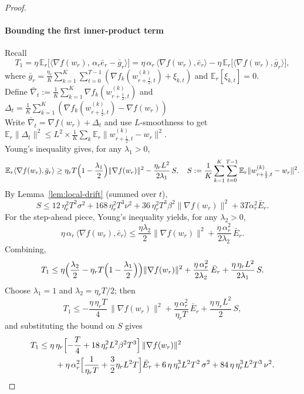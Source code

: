 \documentclass{article} %
\newcommand{\E}{\mathbb{E}}
\begin{document}
\begin{proof}
\paragraph{Bounding the first inner-product term}
Recall
\[
T_{1}
=\eta\,\E_{r}\!\bigl[\langle\nabla f(w_{r}),\,\alpha_{r}\bar e_{r}-\bar g_{r}\rangle\bigr]
= \eta\,\alpha_r\,\langle\nabla f(w_r),\bar e_r\rangle
   -\eta\,\E_r\!\bigl[\langle\nabla f(w_r),\bar g_r\rangle\bigr],
\]
where
\(
\bar g_r=\frac{\eta_r}{K}\sum_{k=1}^K\sum_{t=0}^{T-1}(\nabla f_k(w_{r+\frac12,t}^{(k)})+\xi_{k,t})
\)
and \(\E_r[\xi_{k,t}]=0\).\\
Define \(\bar\nabla_t := \frac1K\sum_{k=1}^K\nabla f_k(w_{r+\frac12,t}^{(k)})\) and \(\Delta_t = \frac1K\sum_{k=1}^K(\nabla f_k(w_{r+\frac12,t}^{(k)})-\nabla f(w_r))\) \\
Write \(\bar\nabla_t=\nabla f(w_r)+\Delta_t\) and use \(L\)-smoothness to get
\(
\E_r\|\Delta_t\|^2
\le L^2\times \frac1K\sum_k\E_r\|w_{r+\frac12,t}^{(k)}-w_r\|^2.
\) \\
Young’s inequality gives, for any \(\lambda_1>0\),
\[
\E_r\langle\nabla f(w_r),\bar g_r\rangle
\ge \eta_r T\Bigl(1-\frac{\lambda_1}{2}\Bigr)\|\nabla f(w_r)\|^2
-\frac{\eta_r L^2}{2\lambda_1}\,S,
\quad
S:=\frac1K\sum_{k=1}^K\sum_{t=0}^{T-1}\E_r\|w_{r+\frac12,t}^{(k)}-w_r\|^2.
\]
By Lemma~\ref{lem:local-drift} (summed over \(t\)),
\[
S \le
12\,\eta_r^{2}T^{2}\sigma^{2}
+168\,\eta_r^{2}T^{3}\nu^{2}
+36\,\eta_r^{2}T^{3}\beta^{2}\|\nabla f(w_r)\|^{2}
+3T\alpha_r^2 \bar E_r.
\]
For the step-ahead piece, Young’s inequality yields, for any \(\lambda_2>0\),
\[
\eta\,\alpha_r\,\langle\nabla f(w_r),\bar e_r\rangle
\le \frac{\eta\lambda_2}{2}\|\nabla f(w_r)\|^2
   +\frac{\eta\,\alpha_r^2}{2\lambda_2}\,\bar E_r.
\]
Combining,
\[
T_1
\le
\eta\Bigl(\frac{\lambda_2}{2}-\eta_r T\Bigl(1-\frac{\lambda_1}{2}\Bigr)\Bigr)\|\nabla f(w_r)\|^2
+\frac{\eta\,\alpha_r^2}{2\lambda_2}\,\bar E_r
+\frac{\eta\,\eta_r L^2}{2\lambda_1}\,S.
\]
Choose \(\lambda_1=1\) and \(\lambda_2=\eta_r T/2\); then
\[
T_1
\le -\frac{\eta\,\eta_r T}{4}\,\|\nabla f(w_r)\|^2
   +\frac{\eta\,\alpha_r^2}{\eta_r T}\,\bar E_r
   +\frac{\eta\,\eta_r L^2}{2}\,S,
\]
and substituting the bound on \(S\) gives
\begin{align}
T_1
&\le \eta\,\eta_r\Bigl[
   -\frac{T}{4}
   + 18\,\eta_r^{2}L^{2}\beta^{2}T^{3}
\Bigr]\,
\|\nabla f(w_r)\|^{2} \notag\\
&\qquad
+ \eta\,\alpha_r^{2}\Bigl[\frac{1}{\eta_r T}+\frac{3}{2}\eta_r L^{2}T\Bigr]\bar E_r
+ 6\,\eta\,\eta_r^{3}L^{2}T^{2}\,\sigma^{2}
+ 84\,\eta\,\eta_r^{3}L^{2}T^{3}\,\nu^{2}.
\label{eq:T1-final-self}
\end{align}




\end{proof}
\end{document}
